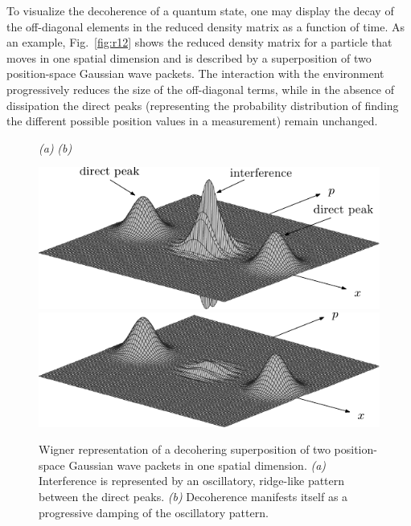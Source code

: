 \documentclass[3p,sort&compress,12pt]{elsarticle}
\begin{document}
To visualize the decoherence of a quantum state, one may display the decay of the off-diagonal elements in the reduced density matrix as a function of time. As an example, Fig.~\ref{fig:r12} shows the reduced density matrix for a particle that moves in one spatial dimension and is described by a superposition of two position-space Gaussian wave packets. The interaction with the environment progressively reduces the size of the off-diagonal terms, while in the absence of dissipation the direct peaks (representing the probability distribution of finding the different possible position values in a measurement) remain unchanged. 

\begin{figure}
{\footnotesize \hspace{1.1cm}\emph{(a)} \hspace{6.9cm} \emph{(b)}}

\centering
\includegraphics[scale=.65]{wigexample.pdf} \hspace{1.5cm}
\includegraphics[scale=.65]{wigexdec.pdf}
\caption{Wigner representation of a decohering superposition of
  two position-space Gaussian wave packets in one spatial dimension. \emph{(a)} Interference is represented by an oscillatory, ridge-like pattern between the direct peaks. \emph{(b)} Decoherence manifests itself as a progressive damping of the oscillatory pattern.}
\label{fig:wig}
\end{figure}
\end{document}
